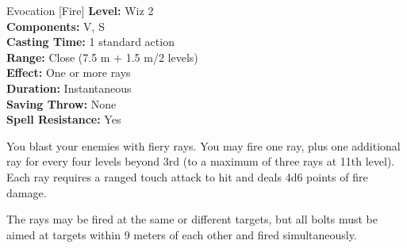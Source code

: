 {Evocation [Fire]}
{
	\textbf{Level:}
	Wiz 2\\
	\textbf{Components:}
	V, S\\
	\textbf{Casting Time:}
	1 standard action\\
	\textbf{Range:}
	Close (7.5 m + 1.5 m/2 levels)\\
	\textbf{Effect:}
	One or more rays\\
	\textbf{Duration:}
	Instantaneous\\
	\textbf{Saving Throw:}
	None\\
	\textbf{Spell Resistance:}
	Yes\\
}
{
	You blast your enemies with fiery rays. You may fire one ray, plus one additional ray for every four levels beyond 3rd (to a maximum of three rays at 11th level). Each ray requires a ranged touch attack to hit and deals 4d6 points of fire damage.

	The rays may be fired at the same or different targets, but all bolts must be aimed at targets within 9 meters of each other and fired simultaneously.

}
